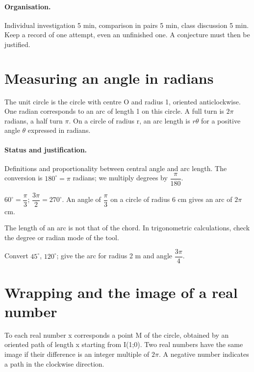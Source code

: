 \paragraph{Organisation.} Individual investigation 5 min, comparison in pairs 5 min, class discussion 5 min. Keep a record of one attempt, even an unfinished one. A conjecture must then be justified.
\mxnewpage
\section{Measuring an angle in radians}\label{C10-U1}
\begin{keypoint}
The unit circle is the circle with centre O and radius 1, oriented anticlockwise. One radian corresponds to an arc of length 1 on this circle. A full turn is $2\pi$ radians, a half turn $\pi$. On a circle of radius r, an arc length is $r\theta$ for a positive angle $\theta$ expressed in radians.
\end{keypoint}
\paragraph{Status and justification.} Definitions and proportionality between central angle and arc length. The conversion is $180^\circ=\pi$ radians; we multiply degrees by $\dfrac{\pi}{180}$.
\begin{example}$60^\circ =\dfrac{\pi}{3}$; $\dfrac{3\pi}{2}=270^\circ $. An angle of $\dfrac{\pi}{3}$ on a circle of radius 6 cm gives an arc of $2\pi$ cm.\end{example}\label{C10-EX1}
\begin{pitfall}The length of an arc is not that of the chord. In trigonometric calculations, check the degree or radian mode of the tool.\end{pitfall}
\begin{application}Convert $45^\circ$, $120^\circ$; give the arc for radius 2 m and angle $\dfrac{3\pi}{4}$.\end{application}\label{C10-AP1}
\section{Wrapping and the image of a real number}\label{C10-U2}
\begin{keypoint}
To each real number x corresponds a point M of the circle, obtained by an oriented path of length x starting from I(1;0). Two real numbers have the same image if their difference is an integer multiple of $2\pi$. A negative number indicates a path in the clockwise direction.
\end{keypoint}
